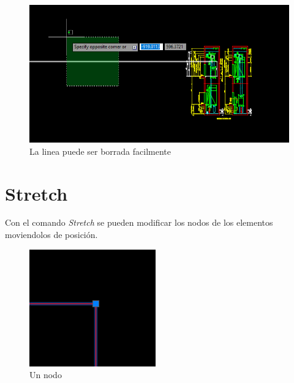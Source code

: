 \documentclass{report}
\begin{document}
\begin{figure}[H]
	\centering
	\includegraphics[width=0.85\linewidth, height=0.5\textheight,keepaspectratio]{Imagenes/autocad_ray04}
	\caption{La linea puede ser borrada facilmente}
	\label{fig:autocadray04}
\end{figure}



\chapter{Stretch}

Con el comando \emph{Stretch} se pueden modificar los nodos de los elementos moviendolos de posición.

\begin{figure}[H]
	\centering
	\includegraphics[width=0.85\linewidth, height=0.5\textheight,keepaspectratio]{Imagenes/autocad_stretch01}
	\caption{Un nodo}
	\label{fig:autocadstretch01}
\end{figure}
\end{document}
